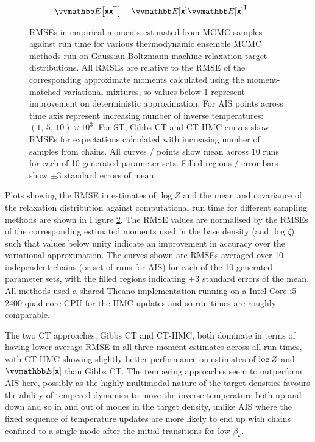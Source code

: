 \begin{figure}
\begin{subfigure}[b]{.7\linewidth}
\caption{$\expc{\rvct{x}\rvct{x}\tr} - \expc{\rvct{x}}\expc{\rvct{x}}\tr$}\label{sfig:bmr-30-unit-scale-6-covar}
\end{subfigure}
\caption[Boltzmann machine relaxation results.]{\acp{RMSE} in empirical moments estimated from \ac{MCMC} samples against run time for various thermodynamic ensemble \ac{MCMC} methods run on Gaussian Boltzmann machine relaxation target distributions. All \acp{RMSE} are relative to the \ac{RMSE} of the corresponding approximate moments calculated using the moment-matched variational mixtures, so values below $1$ represent improvement on deterministic approximation. For \ac{AIS} points across time axis represent increasing number of inverse temperatures: $(1,\, 5,\,10)\times 10^3$. For \ac{ST}, Gibbs \ac{CT} and \ac{CT-HMC} curves show \acp{RMSE} for expectations calculated with increasing number of samples from chains. All curves / points show mean across 10 runs for each of 10 generated parameter sets. Filled regions / error bars show $\pm 3$ standard errors of mean.}
\label{fig:bmr-30-unit-scale-6-results}
\end{figure}

Plots showing the \ac{RMSE} in estimates of $\log Z$ and the mean and covariance of the relaxation distribution against computational run time for different sampling methods are shown in Figure \ref{fig:bmr-30-unit-scale-6-results}. The \ac{RMSE} values are normalised by the \ac{RMSE}s of the corresponding estimated moments used in the base density (and $\log\zeta$) such that values below unity indicate an improvement in accuracy over the variational approximation. The curves shown are \ac{RMSE}s averaged over 10 independent chains (or set of runs for \ac{AIS}) for each of the 10 generated parameter sets, with the filled regions indicating $\pm 3$ standard errors of the mean. All methods used a shared Theano \citep{theano2016theano} implementation running on a Intel Core i5-2400 quad-core CPU for the \ac{HMC} updates and so run times are roughly comparable.

The two \ac{CT} approaches, Gibbs \ac{CT} and \ac{CT-HMC}, both dominate in terms of having lower average \ac{RMSE} in all three moment estimates across all run times, with \ac{CT-HMC} showing slightly better performance on estimates of $\log Z$ and $\expc{\rvct{x}}$ than Gibbs \ac{CT}. The tempering approaches seem to outperform \ac{AIS} here, possibly as the highly multimodal nature of the target densities favours the ability of tempered dynamics to move the inverse temperature both up and down and so in and out of modes in the target density, unlike \ac{AIS} where the fixed sequence of temperature updates are more likely to end up with chains confined to a single mode after the initial transitions for low $\beta_k$.

